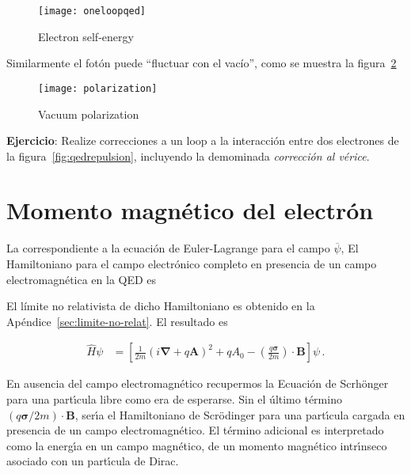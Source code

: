 \begin{frame}
\begin{figure}
  \centering
  \texttt{[image: oneloopqed]}
  \caption{Electron self-energy}
  \label{fig:selfenergy}
\end{figure}
\end{frame}

Similarmente el fotón puede ``fluctuar con el vacío'', como se muestra la figura~\ref{fig:polarization}

\begin{frame}

\begin{figure}
  \centering
  \texttt{[image: polarization]}
  \caption{Vacuum polarization}
  \label{fig:polarization}
\end{figure}
\end{frame}

\textbf{Ejercicio}:
Realize correcciones a un loop a la interacción entre dos electrones de la figura~\ref{fig:qedrepulsion}, incluyendo la demominada \emph{corrección al vérice}.

\section{Momento magnético del electrón}
La correspondiente a la ecuación de Euler-Lagrange para el campo $\overline{\psi}$,
El Hamiltoniano para el campo electrónico completo en presencia de un campo electromagnética en la QED es

\begin{frame}
El límite no relativista de dicho Hamiltoniano es obtenido en la Apéndice~\ref{sec:limite-no-relat}. El resultado es

\begin{align}
  \widehat{H}\psi
  &=\left[\frac{1}{2m}(i\boldsymbol{\nabla}+q \mathbf{A})^2+q A_0-\left(\frac{q\boldsymbol{\sigma}}{2m}\right)\cdot\mathbf{B}\right]\psi\,.
\end{align}

\end{frame}
En ausencia del campo electromagn\'etico recupermos la Ecuaci\'on de Scrh\"onger para una part\'\i cula libre como era de esperarse. Sin el \'ultimo t\'ermino $({q\boldsymbol{\sigma}}/{2m})\cdot\mathbf{B}$, ser\'\i a el Hamiltoniano de Scr\"odinger para una part\'\i cula cargada en presencia de un campo electromagn\'etico. El t\'ermino adicional es interpretado como la energ\'\i a en un campo magn\'etico, de un momento magn\'etico intr\'\i nseco asociado con un part\'\i cula de Dirac.

